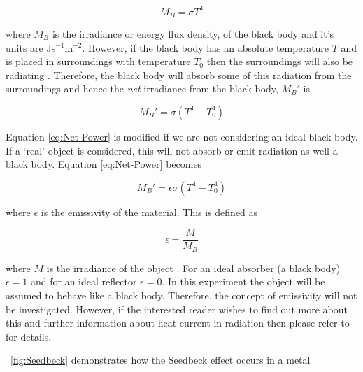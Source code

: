 \documentclass{article}
\newcommand{\figref}[2][\figurename~]{#1\ref{#2}}
\begin{document}
\begin{equation}
\label{eq:SB-Law1}
M_B = \sigma T^4
\end{equation}

\vspace{2mm}
\noindent
where $M_B$ is the irradiance or energy flux density, of the black body \cite{Paper01} and it's units are Js$^{-1}$m$^{-2}$. However, if the black body has an absolute temperature $T$ and is placed in surroundings with temperature $T_0$ then the surroundings will also be radiating \cite{Book01}. Therefore, the black body will absorb some of this radiation from the surroundings and hence the \textit{net} irradiance from the black body, $M_B '$ is

\begin{equation}
\label{eq:Net-Power}
M_B ' = \sigma (T^4 - T_0^4)
\end{equation}

\vspace{2mm}
\noindent
Equation \eqref{eq:Net-Power} is modified if we are not considering an ideal black body. If a `real' object is considered, this will not absorb or emit radiation as well a black body. Equation \eqref{eq:Net-Power} becomes

\begin{equation}
\label{eq:Net-Power2}
M_B ' = \epsilon \sigma (T^4 - T_0^4)
\end{equation}

\vspace{2mm}
\noindent
where $\epsilon$ is the emissivity of the material. This is defined as

\begin{equation}
\label{eq:Emissivity}
\epsilon = \frac{M}{M_B}
\end{equation}

\vspace{2mm}
\noindent
where $M$ is the irradiance of the object \cite{Paper01}. For an ideal absorber (a black body) $\epsilon = 1$ and for an ideal reflector $\epsilon = 0$. In this experiment the object will be assumed to behave like a black body. Therefore, the concept of emissivity will not be investigated. However, if the interested reader wishes to find out more about this and further information about heat current in radiation then please refer to \cite{Book01} for details.

\vspace{2mm}
\noindent
\figref{fig:Seedbeck} \cite{Paper02} demonstrates how the Seedbeck effect occurs in a metal
\end{document}
